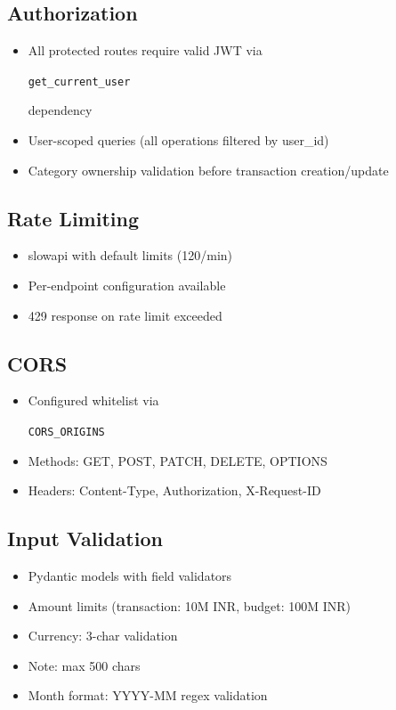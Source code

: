 \documentclass[11pt,a4paper]{article}
\newcommand{\code}[1]{\colorbox{codebg}{\strut\texttt{\small #1}}}
\begin{document}
\subsection{Authorization}
\begin{itemize}[leftmargin=*,itemsep=1pt]
  \item All protected routes require valid JWT via \code{get\_current\_user} dependency
  \item User-scoped queries (all operations filtered by user\_id)
  \item Category ownership validation before transaction creation/update
\end{itemize}

\subsection{Rate Limiting}
\begin{itemize}[leftmargin=*,itemsep=1pt]
  \item slowapi with default limits (120/min)
  \item Per-endpoint configuration available
  \item 429 response on rate limit exceeded
\end{itemize}

\subsection{CORS}
\begin{itemize}[leftmargin=*,itemsep=1pt]
  \item Configured whitelist via \code{CORS\_ORIGINS}
  \item Methods: GET, POST, PATCH, DELETE, OPTIONS
  \item Headers: Content-Type, Authorization, X-Request-ID
\end{itemize}

\subsection{Input Validation}
\begin{itemize}[leftmargin=*,itemsep=1pt]
  \item Pydantic models with field validators
  \item Amount limits (transaction: 10M INR, budget: 100M INR)
  \item Currency: 3-char validation
  \item Note: max 500 chars
  \item Month format: YYYY-MM regex validation
\end{itemize}
\end{document}
